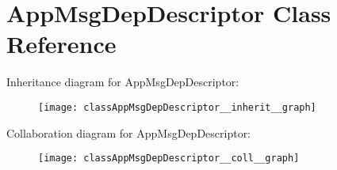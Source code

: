 \hypertarget{classAppMsgDepDescriptor}{}\section{App\+Msg\+Dep\+Descriptor Class Reference}
\label{classAppMsgDepDescriptor}


Inheritance diagram for App\+Msg\+Dep\+Descriptor\+:\nopagebreak
\begin{figure}[H]
\begin{center}
\leavevmode
\texttt{[image: classAppMsgDepDescriptor\_\_inherit\_\_graph]}
\end{center}
\end{figure}


Collaboration diagram for App\+Msg\+Dep\+Descriptor\+:\nopagebreak
\begin{figure}[H]
\begin{center}
\leavevmode
\texttt{[image: classAppMsgDepDescriptor\_\_coll\_\_graph]}
\end{center}
\end{figure}
